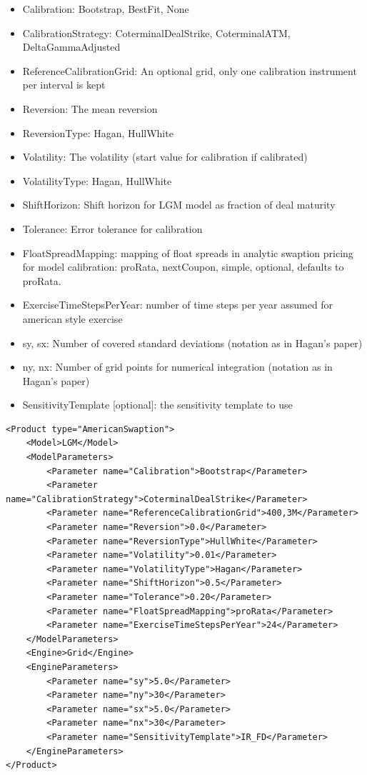 \begin{itemize}
\item Calibration: Bootstrap, BestFit, None
\item CalibrationStrategy: CoterminalDealStrike, CoterminalATM, DeltaGammaAdjusted
\item ReferenceCalibrationGrid: An optional grid, only one calibration instrument per interval is kept
\item Reversion: The mean reversion
\item ReversionType: Hagan, HullWhite
\item Volatility: The volatility (start value for calibration if calibrated)
\item VolatilityType: Hagan, HullWhite
\item ShiftHorizon: Shift horizon for LGM model as fraction of deal maturity
\item Tolerance: Error tolerance for calibration
\item FloatSpreadMapping: mapping of float spreads in analytic swaption pricing for model calibration: proRata,
  nextCoupon, simple, optional, defaults to proRata.
\item ExerciseTimeStepsPerYear: number of time steps per year assumed for american style exercise
\item sy, sx: Number of covered standard deviations (notation as in Hagan's paper)
\item ny, nx: Number of grid points for numerical integration (notation as in Hagan's paper)
\item SensitivityTemplate [optional]: the sensitivity template to use
\end{itemize}

\begin{longlisting}
\begin{verbatim}
<Product type="AmericanSwaption">
    <Model>LGM</Model>
    <ModelParameters>
        <Parameter name="Calibration">Bootstrap</Parameter>
        <Parameter name="CalibrationStrategy">CoterminalDealStrike</Parameter>
        <Parameter name="ReferenceCalibrationGrid">400,3M</Parameter>
        <Parameter name="Reversion">0.0</Parameter>
        <Parameter name="ReversionType">HullWhite</Parameter>
        <Parameter name="Volatility">0.01</Parameter>
        <Parameter name="VolatilityType">Hagan</Parameter>
        <Parameter name="ShiftHorizon">0.5</Parameter>
        <Parameter name="Tolerance">0.20</Parameter>
        <Parameter name="FloatSpreadMapping">proRata</Parameter>
        <Parameter name="ExerciseTimeStepsPerYear">24</Parameter>
    </ModelParameters>
    <Engine>Grid</Engine>
    <EngineParameters>
        <Parameter name="sy">5.0</Parameter>
        <Parameter name="ny">30</Parameter>
        <Parameter name="sx">5.0</Parameter>
        <Parameter name="nx">30</Parameter>
        <Parameter name="SensitivityTemplate">IR_FD</Parameter>
    </EngineParameters>
</Product>
\end{verbatim}
\caption{Configuration for Product AmericanSwaption, Model LGM, Engine Grid (Not recommended due to inferior performance)}
\label{lst:peconfig_AmericanSwaption_LGM_Grid}
\end{longlisting}

